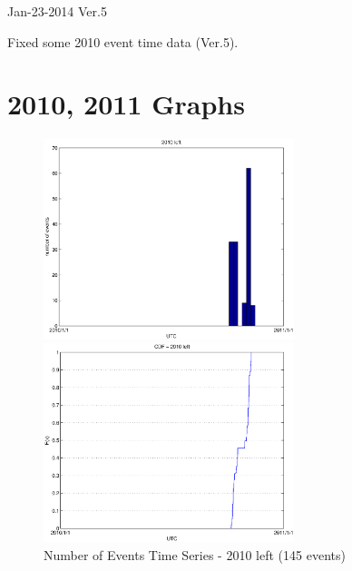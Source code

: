 \documentclass[a4paper,11pt]{article}
\begin{document}
\pagestyle{empty}

\begin{rightline}
{Jan-23-2014 Ver.5}
\end{rightline}

\noindent
Fixed some 2010 event time data (Ver.5).

\section{2010, 2011 Graphs}
\begin{figure}[htbp]
\begin{minipage}{0.55\hsize}
\centering
\includegraphics[width=7.3cm, clip]{histTime2010L.eps}
\end{minipage}
\begin{minipage}{0.55\hsize}
 \centering
\includegraphics[width=7.3cm, clip]{CDFTime2010L.eps}
\end{minipage}
\caption{Number of Events Time Series - 2010 left (145 events)}
\end{figure}
\end{document}
